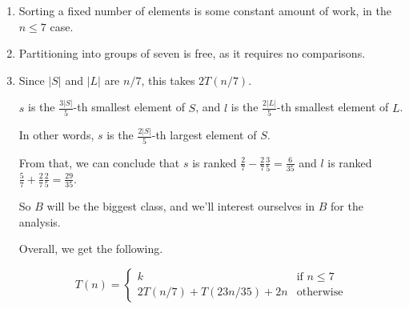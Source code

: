 \documentclass{article}
\begin{document}
\begin{enumerate}
    \item Sorting a fixed number of elements is some constant amount of work, in the $n \leq 7$ case.
    \item Partitioning into groups of seven is free, as it requires no comparisons.
    \item Since $|S|$ and $|L|$ are $n/7$, this takes $2 T(n/7)$.

        $s$ is the $\frac{3|S|}{5}$-th smallest element of $S$, and $l$ is the $\frac{2|L|}{5}$-th smallest element of $L$.

        In other words, $s$ is the $\frac{2|S|}{5}$-th largest element of $S$.

        From that, we can conclude that $s$ is ranked $\frac{2}{7} - \frac{2}{7} \frac{3}{5} = \frac{6}{35}$ and $l$ is ranked $\frac{5}{7} + \frac{2}{7} \frac{2}{5} = \frac{29}{35}$.

        So $B$ will be the biggest class, and we'll interest ourselves in $B$ for the analysis.

        Overall, we get the following.

        \begin{equation*}
            T(n) =
            \begin{cases}
                k & \text{if } n \leq 7 \\
                2 T(n/7) + T(23n/35) + 2n & \text{otherwise}
            \end{cases}
        \end{equation*}
\end{enumerate}
\end{document}
